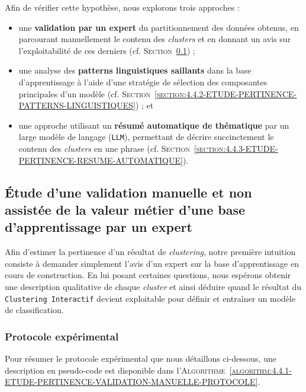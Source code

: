 	Afin de vérifier cette hypothèse, nous explorons trois approches :
	\begin{itemize}
		\item une \textbf{validation par un expert} du partitionnement des données obtenus, en parcourant manuellement le contenu des \textit{clusters} et en donnant un avis sur l'exploitabilité de ces derniers (cf. \textsc{Section~\ref{section:4.4.1-ETUDE-PERTINENCE-VALIDATION-MANUELLE}}) ;
		\item une analyse des \textbf{patterns linguistiques saillants} dans la base d'apprentissage à l'aide d'une stratégie de sélection des composantes principales d'un modèle (cf. \textsc{Section~\ref{section:4.4.2-ETUDE-PERTINENCE-PATTERNS-LINGUISTIQUES}}) ; et
		\item une approche utilisant un \textbf{résumé automatique de thématique} par un large modèle de langage (\texttt{LLM}), permettant de décrire succinctement le contenu des \textit{clusters} en une phrase (cf. \textsc{Section~\ref{section:4.4.3-ETUDE-PERTINENCE-RESUME-AUTOMATIQUE}}).
	\end{itemize}
	
	
	\subsection{Étude d'une validation manuelle et non assistée de la valeur métier d'une base d'apprentissage par un expert}
	\label{section:4.4.1-ETUDE-PERTINENCE-VALIDATION-MANUELLE}
		
		Afin d'estimer la pertinence d'un résultat de \textit{clustering}, notre première intuition consiste à demander simplement l'avis d'un expert sur la base d'apprentissage en cours de construction.
		En lui posant certaines questions, nous espérons obtenir une description qualitative de chaque \textit{cluster} et ainsi déduire quand le résultat du \texttt{Clustering Interactif} devient exploitable pour définir et entraîner un modèle de classification.
	
		\subsubsection{Protocole expérimental}
			
			Pour résumer le protocole expérimental que nous détaillons ci-dessous, une description en pseudo-code est disponible dans l'\textsc{Algorithme~\ref{algorithm:4.4.1-ETUDE-PERTINENCE-VALIDATION-MANUELLE-PROTOCOLE}}.
			
